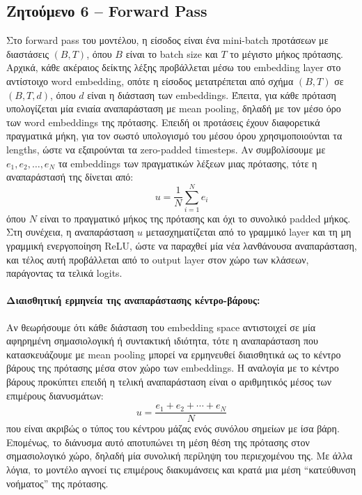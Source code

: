 \documentclass[11pt,a4paper]{article}
\begin{document}
\subsection*{Ζητούμενο 6 -- \textlatin{Forward Pass}}


Στο \textlatin{forward pass} του μοντέλου, η είσοδος είναι ένα \textlatin{mini-batch} προτάσεων με διαστάσεις \((B, T)\), όπου \(B\) είναι 
το \textlatin{batch size} και \(T\) το μέγιστο μήκος πρότασης. Αρχικά, κάθε ακέραιος δείκτης λέξης προβάλλεται μέσω του \textlatin{embedding layer} 
στο αντίστοιχο \textlatin{word embedding}, οπότε η είσοδος μετατρέπεται από σχήμα \((B, T)\) σε \((B, T, d)\), όπου \(d\) είναι η διάσταση 
των \textlatin{embeddings}. Έπειτα, για κάθε πρόταση υπολογίζεται μία ενιαία αναπαράσταση με \textlatin{mean pooling}, δηλαδή με τον μέσο όρο των 
\textlatin{word embeddings} της πρότασης. Επειδή οι προτάσεις έχουν διαφορετικά πραγματικά μήκη, για τον σωστό υπολογισμό του μέσου όρου χρησιμοποιούνται 
τα \textlatin{lengths}, ώστε να εξαιρούνται τα \textlatin{zero-padded timesteps}. Αν συμβολίσουμε με \(e_1, e_2, \dots, e_N\) τα \textlatin{embeddings} 
των πραγματικών λέξεων μιας πρότασης, τότε η αναπαράστασή της δίνεται από:
\[
u = \frac{1}{N}\sum_{i=1}^{N} e_i
\]
όπου \(N\) είναι το πραγματικό μήκος της πρότασης και όχι το συνολικό \textlatin{padded} μήκος. Στη συνέχεια, η αναπαράσταση \(u\) μετασχηματίζεται 
από το γραμμικό \textlatin{layer} και τη μη γραμμική ενεργοποίηση \textlatin{ReLU}, ώστε να παραχθεί μία νέα λανθάνουσα αναπαράσταση, και τέλος αυτή 
προβάλλεται από το \textlatin{output layer} στον χώρο των κλάσεων, παράγοντας τα τελικά \textlatin{logits}.

\paragraph{Διαισθητική ερμηνεία της αναπαράστασης κέντρο-βάρους:}

Αν θεωρήσουμε ότι κάθε διάσταση του \textlatin{embedding space} αντιστοιχεί σε μία αφηρημένη σημασιολογική ή συντακτική ιδιότητα, τότε η αναπαράσταση 
που κατασκευάζουμε με \textlatin{mean pooling} μπορεί να ερμηνευθεί διαισθητικά ως το κέντρο βάρους της πρότασης μέσα στον χώρο των 
\textlatin{embeddings}. Η αναλογία με το κέντρο βάρους προκύπτει επειδή η τελική αναπαράσταση είναι ο αριθμητικός μέσος των επιμέρους διανυσμάτων:
\[
u = \frac{e_1 + e_2 + \cdots + e_N}{N}
\]
που είναι ακριβώς ο τύπος του κέντρου μάζας ενός συνόλου σημείων με ίσα βάρη. Επομένως, το διάνυσμα αυτό αποτυπώνει τη μέση θέση της πρότασης στον 
σημασιολογικό χώρο, δηλαδή μία συνολική περίληψη του περιεχομένου της. Με άλλα λόγια, το μοντέλο αγνοεί τις επιμέρους διακυμάνσεις και κρατά μια μέση 
``κατεύθυνση νοήματος'' της πρότασης.
\end{document}
